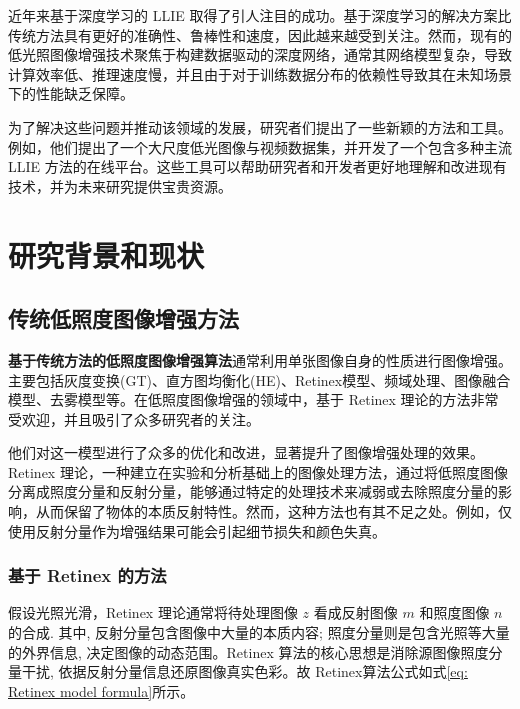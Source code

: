 \documentclass[a4paper]{ctexart}
\begin{document}
	近年来基于深度学习的 LLIE 取得了引人注目的成功。基于深度学习的解决方案比传统方法具有更好的准确性、鲁棒性和速度，因此越来越受到关注。然而，现有的低光照图像增强技术聚焦于构建数据驱动的深度网络，通常其网络模型复杂，导致计算效率低、推理速度慢，并且由于对于训练数据分布的依赖性导致其在未知场景下的性能缺乏保障。
	
	为了解决这些问题并推动该领域的发展，研究者们提出了一些新颖的方法和工具。例如，他们提出了一个大尺度低光图像与视频数据集，并开发了一个包含多种主流 LLIE 方法的在线平台。这些工具可以帮助研究者和开发者更好地理解和改进现有技术，并为未来研究提供宝贵资源。
	
	\section{研究背景和现状}
	
	\subsection{传统低照度图像增强方法}
	\textbf{基于传统方法的低照度图像增强算法}通常利用单张图像自身的性质进行图像增强。主要包括灰度变换(GT)\textcolor{blue}{\cite{ueng1995gamma}}、直方图均衡化(HE)\textcolor{blue}{\cite{stark2000adaptive}}、Retinex模型\textcolor{blue}{\cite{land1971lightness}}、频域处理\textcolor{blue}{\cite{liu2021benchmarking}}、图像融合模型\textcolor{blue}{\cite{dai2019fractional}}、去雾模型\textcolor{blue}{\cite{ma2019improved}}等。在低照度图像增强的领域中，基于 Retinex 理论的方法非常受欢迎，并且吸引了众多研究者的关注。
	
	他们对这一模型进行了众多的优化和改进，显著提升了图像增强处理的效果。Retinex 理论，一种建立在实验和分析基础上的图像处理方法，通过将低照度图像分离成照度分量和反射分量，能够通过特定的处理技术来减弱或去除照度分量的影响，从而保留了物体的本质反射特性。然而，这种方法也有其不足之处。例如，仅使用反射分量作为增强结果可能会引起细节损失和颜色失真。
	
	\subsubsection{基于 Retinex 的方法}
	
	假设光照光滑，Retinex 理论通常将待处理图像 $z$ 看成反射图像 $m$ 和照度图像 $n$ 的合成. 其中, 反射分量包含图像中大量的本质内容; 照度分量则是包含光照等大量的外界信息, 决定图像的动态范围。Retinex 算法的核心思想是消除源图像照度分量干扰, 依据反射分量信息还原图像真实色彩。故 Retinex算法公式如式\ref{eq: Retinex model formula}所示。
	
\end{document}

